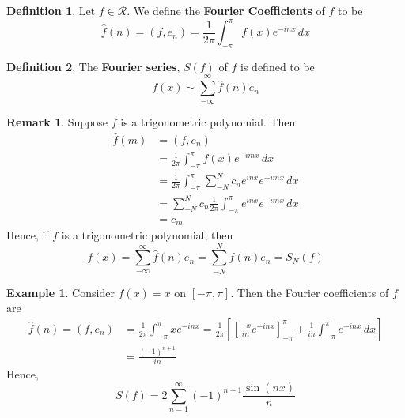 \documentclass[10pt, oneside]{article}
\theoremstyle{definition}
\newtheorem{exmp}{Example}[section]
\newtheorem{defn}{Definition}
\newtheorem{rem}{Remark}
\begin{document}
\begin{defn}
    Let $f \in \mathcal{R}.$ We define the \textbf{Fourier Coefficients} of $f$ to be 
    \[\hat{f}(n) = ( f, e_n )  =\frac{1}{2\pi}\int_{-\pi}^\pi f(x) e^{-inx}\,dx\]
\end{defn}
\begin{defn}
    The \textbf{Fourier series}, $S(f)$ of $f$ is defined to be 
    \[f(x)\sim \sum_{-\infty}^\infty \hat{f}(n) e_n\]
\end{defn}
\begin{rem}
    Suppose $f$ is a trigonometric polynomial. Then 
    \begin{align*}
        \hat{f}(m) &= (f,e_n)\\
        &= \frac{1}{2\pi}\int_{-\pi}^\pi f(x)e^{-imx}\,dx\\
        &= \frac{1}{2\pi}\int_{-\pi}^\pi \sum_{-N}^N c_ne^{inx}e^{-imx}\,dx\\
        &= \sum_{-N}^N c_n \frac{1}{2\pi}\int_{-\pi}^\pi e^{inx}e^{-imx}\,dx\\
        &= c_m
    \end{align*}
    Hence, if $f$ is a trigonometric polynomial, then 
    \[f(x) = \sum_{-\infty}^\infty \hat{f}(n)e_n = \sum_{-N}^N \hat{f}(n)e_n= S_N(f)\]
\end{rem}
\begin{exmp}
    Consider $f(x) = x$ on $[-\pi, \pi].$ Then the Fourier coefficients of $f$ are 
    \begin{align*}
      \hat{f}(n) = (f,e_n) &= \frac{1}{2\pi}\int_{-\pi}^\pi x e^{-inx} = \frac{1}{2\pi}\left[\left[\frac{-x}{in}e^{-inx}\right]_{-\pi}^\pi 
 + \frac{1}{in}\int_{-\pi}^\pi e^{-inx}\,dx \right] \\
 &= \frac{(-1)^{n+1}}{in}
    \end{align*}
    Hence, 
    \[S(f) = 2\sum_{n=1}^\infty (-1)^{n+1} \frac{\sin(nx)}{n}\]
\end{exmp}

\newpage
\end{document}
